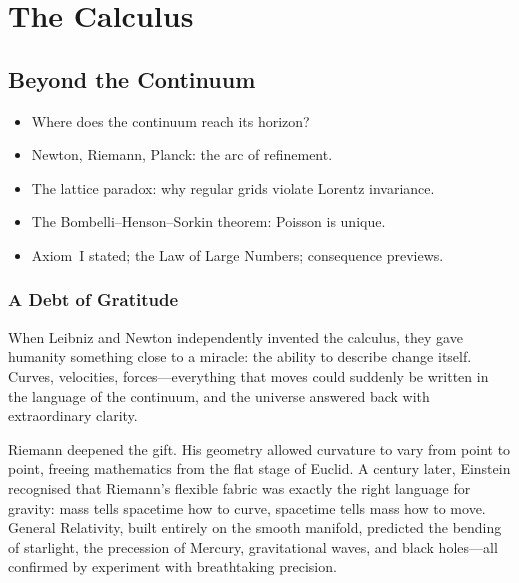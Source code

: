 \documentclass[11pt, a4paper, openany]{book}
\newenvironment{introduction}[1][Modulo Overview]{%
  \begin{tcolorbox}[
    enhanced,colback=structure!5,colframe=structure,
    colbacktitle=structure,coltitle=white,
    fonttitle=\small\bfseries,title={#1},
    arc=2pt,boxrule=0.7pt,
    left=8pt,right=8pt,top=6pt,bottom=6pt,
    before skip=12pt,after skip=12pt
  ]\itshape\begin{itemize}[leftmargin=*,itemsep=2pt,parsep=0pt]
}{%
  \end{itemize}\end{tcolorbox}
}
\begin{document}
\mainmatter

\part{The Calculus}

\chapter{Beyond the Continuum}\label{ch:beyond}

\begin{introduction}
  \item Where does the continuum reach its horizon?
  \item Newton, Riemann, Planck: the arc of refinement.
  \item The lattice paradox: why regular grids violate Lorentz invariance.
  \item The Bombelli--Henson--Sorkin theorem: Poisson is unique.
  \item Axiom~I stated; the Law of Large Numbers; consequence previews.
\end{introduction}

\section{A Debt of Gratitude}

When Leibniz and Newton independently invented the calculus, they gave
humanity something close to a miracle: the ability to describe change
itself. Curves, velocities, forces---everything that moves could suddenly
be written in the language of the continuum, and the universe answered
back with extraordinary clarity.

Riemann deepened the gift. His geometry allowed curvature to vary from
point to point, freeing mathematics from the flat stage of Euclid.
A century later, Einstein recognised that Riemann's flexible fabric was
exactly the right language for gravity: mass tells spacetime how to
curve, spacetime tells mass how to move. General Relativity, built
entirely on the smooth manifold, predicted the bending of starlight,
the precession of Mercury, gravitational waves, and black holes---all
confirmed by experiment with breathtaking precision.
\end{document}
